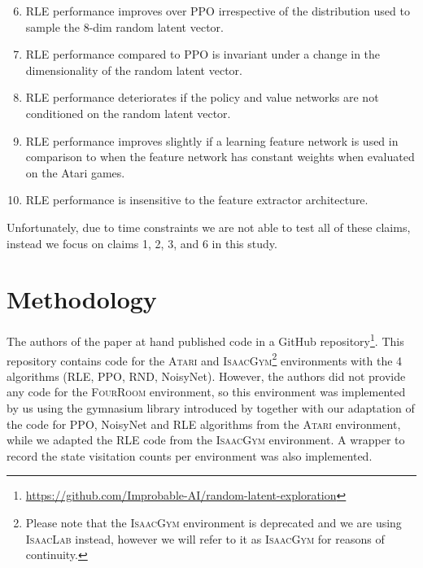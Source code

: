 \documentclass[10pt]{article} %
\begin{document}
\begin{enumerate}
  \setcounter{enumi}{5}
  \item RLE performance improves over PPO irrespective of the distribution used to sample the 8-dim random latent vector.
  \item RLE performance compared to PPO is invariant under a change in the dimensionality of the random latent vector.
  \item RLE performance deteriorates if the policy and value networks are not conditioned on the random latent vector.
  \item RLE performance improves slightly if a learning feature network is used in comparison to when the feature network has constant weights when evaluated on the Atari games.
  \item RLE performance is insensitive to the feature extractor architecture.
\end{enumerate}


\noindent Unfortunately, due to time constraints we are not able to test all of these claims, instead we focus on claims 1, 2, 3, and 6 in this study.

\section{Methodology}

\noindent The authors of the paper at hand published code in a GitHub repository\footnote{\href{https://github.com/Improbable-AI/random-latent-exploration}{https://github.com/Improbable-AI/random-latent-exploration}}. This repository contains code for the \textsc{Atari} and \textsc{IsaacGym}\footnote{Please note that the \textsc{IsaacGym} environment is deprecated and we are using \textsc{IsaacLab} instead, however we will refer to it as \textsc{IsaacGym} for reasons of continuity.} environments with the 4 algorithms (RLE, PPO, RND, NoisyNet). However, the authors did not provide any code for the \textsc{FourRoom} environment, so this environment was implemented by us using the gymnasium library introduced by \cite{gymnasium-paper} together with our adaptation of the code for PPO, NoisyNet and RLE algorithms from the \textsc{Atari} environment, while we adapted the RLE code from the \textsc{IsaacGym} environment. A wrapper to record the state visitation counts per environment was also implemented.
\end{document}
